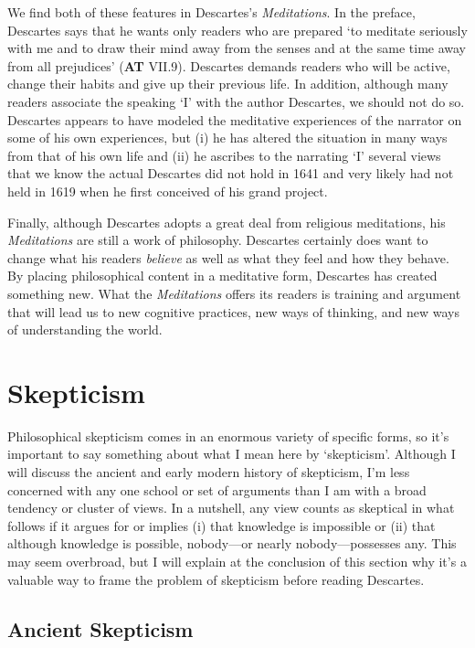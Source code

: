 We find both of these features in Descartes's \textit{Meditations}. In the preface, Descartes says that he wants only readers who are prepared `to meditate seriously with me and to draw their mind away from the senses and at the same time away from all prejudices' (\textbf{AT} VII.9). Descartes demands readers who will be active, change their habits and give up their previous life. In addition, although many readers associate the speaking `I' with the author Descartes, we should not do so. Descartes appears to have modeled the meditative experiences of the narrator on some of his own experiences, but (i) he has altered the situation in many ways from that of his own life and (ii) he ascribes to the narrating `I' several views that we know the actual Descartes did not hold in 1641 and very likely had not held in 1619 when he first conceived of his grand project.

Finally, although Descartes adopts a great deal from religious meditations, his \textit{Meditations} are still a work of philosophy. Descartes certainly does want to change what his readers \textit{believe} as well as what they feel and how they behave. By placing philosophical content in a meditative form, Descartes has created something new. What the \textit{Meditations} offers its readers is training and argument that will lead us to new cognitive practices, new ways of thinking, and new ways of understanding the world.

\section*{Skepticism}

Philosophical skepticism comes in an enormous variety of specific forms, so it's important to say something about what I mean here by `skepticism'. Although I will discuss the ancient and early modern history of skepticism, I'm less concerned with any one school or set of arguments than I am with a broad tendency or cluster of views. In a nutshell, any view counts as skeptical in what follows if it argues for or implies (i) that knowledge is impossible or (ii) that although knowledge is possible, nobody---or nearly nobody---possesses any. This may seem overbroad, but I will explain at the conclusion of this section why it's a valuable way to frame the problem of skepticism before reading Descartes.

\subsection*{Ancient Skepticism}


